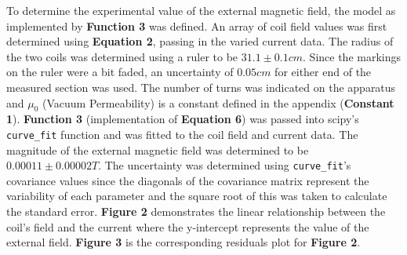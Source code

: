 \documentclass[
	letterpaper, %
	10pt, %
]{CSUniSchoolLabReport}
\begin{document}
To determine the experimental value of the external magnetic field, the model as implemented by \textbf{Function 3}
was defined. An array of coil field values was first determined using \textbf{Equation 2}, passing in the varied
current data. The radius of the two coils was determined using a ruler to be $31.1 \pm 0.1 cm$. Since the markings
on the ruler were a bit faded, an uncertainty of $0.05 cm$ for either end of the measured section was used.
The number of turns was indicated on the apparatus and $\mu_0$ (Vacuum Permeability) is a constant defined in the
appendix (\textbf{Constant 1}). \textbf{Function 3} (implementation of \textbf{Equation 6}) was passed into scipy's \lstinline{curve_fit} function and was fitted to the coil field
and current data. The magnitude of the external magnetic field was determined to be $0.00011 \pm 0.00002 T$.
The uncertainty was determined using \lstinline{curve_fit}'s covariance values since the diagonals of the covariance
matrix represent the variability of each parameter and the square root of this was taken to calculate the
standard error. \textbf{Figure 2} demonstrates the linear relationship between the coil's field and the current where
the y-intercept represents the value of the external field. \textbf{Figure 3} is the corresponding residuals plot for \textbf{Figure 2}. \\
\end{document}
